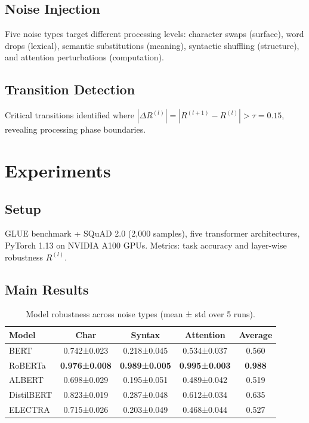 \documentclass{article}
\begin{document}
\subsection{Noise Injection}
Five noise types target different processing levels: character swaps (surface), word drops (lexical), semantic substitutions (meaning), syntactic shuffling (structure), and attention perturbations (computation).

\subsection{Transition Detection}
Critical transitions identified where $|\Delta R^{(l)}| = |R^{(l+1)} - R^{(l)}| > \tau = 0.15$, revealing processing phase boundaries.

\section{Experiments}

\subsection{Setup}
GLUE benchmark + SQuAD 2.0 (2,000 samples), five transformer architectures, PyTorch 1.13 on NVIDIA A100 GPUs. Metrics: task accuracy and layer-wise robustness $R^{(l)}$.

\subsection{Main Results}

\begin{table}[h]
\centering
\small
\caption{Model robustness across noise types (mean ± std over 5 runs).}
\label{tab:main_results}
\begin{tabular}{l|ccc|c}
\toprule
Model & Char & Syntax & Attention & Average \\
\midrule
BERT & 0.742±0.023 & 0.218±0.045 & 0.534±0.037 & 0.560 \\
RoBERTa & \textbf{0.976±0.008} & \textbf{0.989±0.005} & \textbf{0.995±0.003} & \textbf{0.988} \\
ALBERT & 0.698±0.029 & 0.195±0.051 & 0.489±0.042 & 0.519 \\
DistilBERT & 0.823±0.019 & 0.287±0.048 & 0.612±0.034 & 0.635 \\
ELECTRA & 0.715±0.026 & 0.203±0.049 & 0.468±0.044 & 0.527 \\
\bottomrule
\end{tabular}
\end{table}
\end{document}
